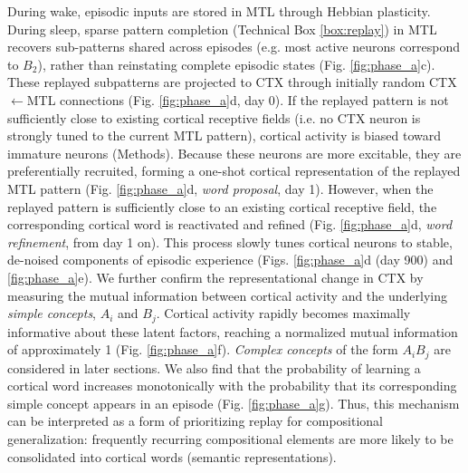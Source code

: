 \documentclass{article}
\begin{document}
During wake, episodic inputs are stored in MTL through Hebbian plasticity. During sleep, sparse pattern completion (Technical Box \ref{box:replay}) in MTL recovers sub-patterns shared across episodes (e.g. most active neurons correspond to $B_2$), rather than reinstating complete episodic states (Fig. \ref{fig:phase_a}c). These replayed subpatterns are projected to CTX through initially random CTX$\leftarrow$MTL connections (Fig. \ref{fig:phase_a}d, day 0). If the replayed pattern is not sufficiently close to existing cortical receptive fields (i.e. no CTX neuron is strongly tuned to the current MTL pattern), cortical activity is biased toward immature neurons (Methods). Because these neurons are more excitable, they are preferentially recruited, forming a one-shot cortical representation of the replayed MTL pattern (Fig. \ref{fig:phase_a}d, \textit{word proposal}, day 1). However, when the replayed pattern is sufficiently close to an existing cortical receptive field, the corresponding cortical word is reactivated and refined (Fig. \ref{fig:phase_a}d, \textit{word refinement}, from day 1 on). This process slowly tunes cortical neurons to stable, de-noised components of episodic experience (Figs. \ref{fig:phase_a}d (day 900) and \ref{fig:phase_a}e).
\newline\newline
We further confirm the representational change in CTX by measuring the mutual information between cortical activity and the underlying \textit{simple concepts}, $A_i$ and $B_j$. Cortical activity rapidly becomes maximally informative about these latent factors, reaching a normalized mutual information of approximately 1 (Fig. \ref{fig:phase_a}f). \textit{Complex concepts} of the form $A_iB_j$ are considered in later sections. We also find that the probability of learning a cortical word increases monotonically with the probability that its corresponding simple concept appears in an episode (Fig. \ref{fig:phase_a}g). Thus, this mechanism can be interpreted as a form of prioritizing replay for compositional generalization: frequently recurring compositional elements are more likely to be consolidated into cortical words (semantic representations).
\end{document}
